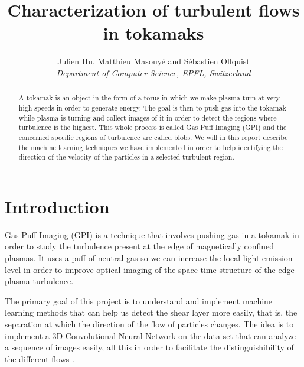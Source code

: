 \documentclass[10pt,conference,compsocconf]{IEEEtran}
\begin{document}
\title{Characterization of turbulent flows in tokamaks}

\author{
  Julien Hu, Matthieu Masouyé and Sébastien Ollquist\\
  \textit{Department of Computer Science, EPFL, Switzerland}
}

\maketitle

\begin{abstract}
  A tokamak is an object in the form of a torus in which we make plasma turn at very high speeds in order to generate energy. The goal is then to push gas into the tokamak while plasma is turning and collect images of it in order to detect the regions where turbulence is the highest. This whole process is called Gas Puff Imaging (GPI) and the concerned specific regions of turbulence are called blobs. We will in this report describe the machine learning techniques we have implemented in order to help identifying the direction of the velocity of the particles in a selected turbulent region.
\end{abstract}

\section{Introduction}
Gas Puff Imaging (GPI) is a technique that involves pushing gas in a tokamak in order to study the turbulence present at the edge of magnetically confined plasmas. It uses a puff of neutral gas so we can increase the local light emission level in order to improve optical imaging of the space-time structure of the edge plasma turbulence.\par
The primary goal of this project is to understand and implement machine learning methods that can help us detect the shear layer more easily, that is, the separation at which the direction of the flow of particles changes. The idea is to implement a 3D Convolutional Neural Network on the data set that can analyze a sequence of images easily, all this in order to facilitate the distinguishibility of the different flows \cite{velocitycnn}.
\end{document}
